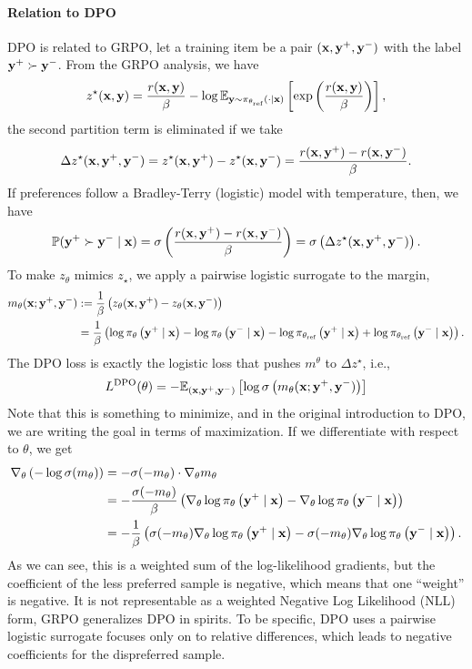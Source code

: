 \documentclass[11pt]{article}  %
\begin{document}
\paragraph{Relation to DPO}
DPO is related to GRPO, let a training item be a pair $(\mathbf{x}, \mathbf{y}^+, \mathbf{y}^-)$ with the label $\mathbf{y}^+ \succ \mathbf{y}^-$.
From the GRPO analysis, we have 
\begin{align*}
  z^\star(\mathbf{x}, \mathbf{y}) = \frac{r(\mathbf{x}, \mathbf{y})}{\beta} - \log \mathbb{E}_{\mathbf{y} \sim \pi_{\theta_{\text{ref}}}\left( \cdot \mid \mathbf{x} \right)}\left[\exp\left( \frac{r(\mathbf{x}, \mathbf{y})}{\beta} \right)\right],
\end{align*}
the second partition term is eliminated if we take 
\begin{align*}
  \Delta z^\star(\mathbf{x}, \mathbf{y}^+, \mathbf{y}^-) = z^\star(\mathbf{x}, \mathbf{y}^+) - z^\star(\mathbf{x}, \mathbf{y}^-) = \frac{r(\mathbf{x}, \mathbf{y}^+) - r(\mathbf{x}, \mathbf{y}^-)}{\beta}.
\end{align*}
If preferences follow a Bradley-Terry (logistic) model with temperature, then, we have 
\begin{align*}
  \mathbb{P}(\mathbf{y}^+ \succ \mathbf{y}^- \mid \mathbf{x}) = \sigma \left( \frac{r(\mathbf{x}, \mathbf{y}^+) - r(\mathbf{x}, \mathbf{y}^-)}{\beta} \right) = \sigma \left( \Delta z^\star(\mathbf{x}, \mathbf{y}^+, \mathbf{y}^-) \right).
\end{align*}
To make $z_{\theta}$ mimics $z_\star$, we apply a pairwise logistic surrogate to the margin, 
\begin{align*}
  m_{\theta}(\mathbf{x}; \mathbf{y}^+, \mathbf{y}^-) &:= \frac{1}{\beta}\left( z_{\theta}(\mathbf{x}, \mathbf{y}^+) - z_{\theta}(\mathbf{x}, \mathbf{y}^-) \right) \\
  &= \frac{1}{\beta}\left( \log\pi_{\theta}\left( \mathbf{y}^+ \mid \mathbf{x} \right) - \log\pi_{\theta}\left( \mathbf{y}^- \mid \mathbf{x} \right) - \log\pi_{\theta_{\text{ref}}}\left( \mathbf{y}^+ \mid \mathbf{x} \right) + \log\pi_{\theta_{\text{ref}}}\left( \mathbf{y}^- \mid \mathbf{x} \right) \right).
\end{align*}
The DPO loss is exactly the logistic loss that pushes $m^\theta$ to $\Delta z^\star$, i.e.,
\begin{align*}
  L^{\text{DPO}}(\theta) = -\mathbb{E}_{(\mathbf{x},\mathbf{y}^+, \mathbf{y}^-)}\left[\log\sigma\left( m_\theta(\mathbf{x}; \mathbf{y}^+, \mathbf{y}^-) \right)\right]
\end{align*}
Note that this is something to minimize, and in the original introduction to DPO, we are writing the goal in terms of maximization.
If we differentiate with respect to $\theta$, we get 
\begin{align*}
  \nabla_{\theta}\left(  - \log \sigma (m_\theta) \right) &= -\sigma(-m_\theta) \cdot \nabla_\theta m_\theta \\
  &= -\frac{\sigma(-m_\theta)}{\beta}\left( \nabla_\theta \log\pi_{\theta}\left( \mathbf{y}^+ \mid \mathbf{x} \right) - \nabla_\theta \log\pi_{\theta}\left( \mathbf{y}^- \mid \mathbf{x} \right) \right) \\
  &= -\frac{1}{\beta}\left( \sigma(-m_\theta)\nabla_\theta \log\pi_{\theta}\left( \mathbf{y}^+ \mid \mathbf{x} \right) - \sigma(-m_\theta)\nabla_\theta \log\pi_{\theta}\left( \mathbf{y}^- \mid \mathbf{x} \right) \right).
\end{align*}
As we can see, this is a weighted sum of the log-likelihood gradients, but the coefficient of the less preferred sample is negative, which means that one ``weight'' is negative. 
It is not representable as a weighted Negative Log Likelihood (NLL) form, GRPO generalizes DPO in spirits.
To be specific, DPO uses a pairwise logistic surrogate focuses only on to relative differences, which leads to negative coefficients for the dispreferred sample.
\end{document}
